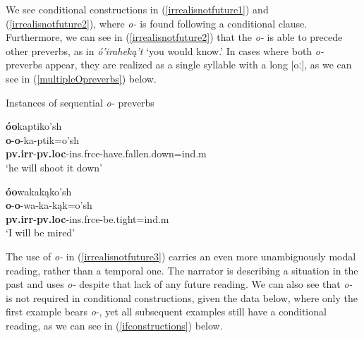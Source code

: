 We see conditional constructions in (\ref{irrealisnotfuture1}) and (\ref{irrealisnotfuture2}), where \textit{o-} is found following a conditional clause. Furthermore, we can see in (\ref{irrealisnotfuture2}) that the \textit{o-} is able to precede other preverbs, as in \textit{ó'iraheką't} `you would know.' In cases where both \textit{o-} preverbs appear, they are realized as a single syllable with a long [oː], as we can see in (\ref{multipleOpreverbs}) below.

\begin{exe}
\item\label{multipleOpreverbs} Instances of sequential \textit{o-} preverbs

	\begin{xlist}
	
	
	\item \glll \textbf{óo}kaptiko'sh\\
	\textbf{o}-\textbf{o}-ka-ptik=o'sh\\
	\textbf{pv.irr}-\textbf{pv.loc}-ins.frce-\textnormal{have.fallen.down}=ind.m\\
	\glt `he will shoot it down' \citep[5]{kennard1936}
	
	\item \glll \textbf{óo}wakakąko'sh\\
	\textbf{o}-\textbf{o}-wa-ka-kąk=o'sh\\
	\textbf{pv.irr}-\textbf{pv.loc}-ins.frce-\textnormal{be.tight}=ind.m\\
	\glt `I will be mired' \citep[5]{kennard1936}
	
	\end{xlist}

\end{exe}

The use of \textit{o-} in (\ref{irrealisnotfuture3}) carries an even more unambiguously modal reading, rather than a temporal one. The narrator is describing a situation in the past and uses \textit{o-} despite that lack of any future reading. We can also see that \textit{o-} is not required in conditional constructions, given the data below, where only the first example bears \textit{o}-, yet all subsequent examples still have a conditional reading, as we can see in (\ref{ifconstructions}) below.

